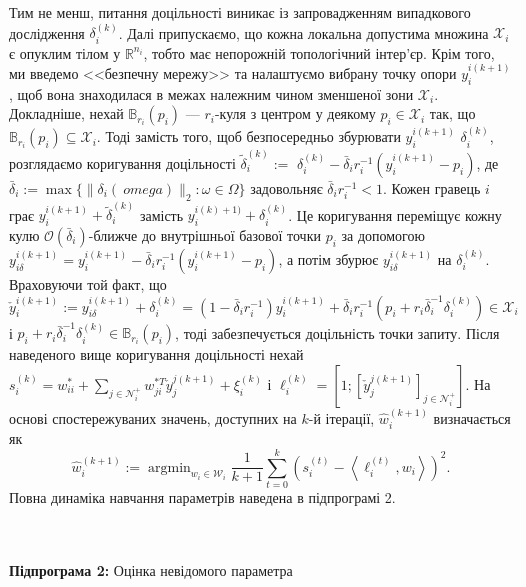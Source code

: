 \documentclass[a4paper]{article}
\begin{document}
Тим не менш, питання доцільності виникає із запровадженням випадкового дослідження $\delta_{i}^{(k)}$. Далі припускаємо, що кожна локальна допустима множина $\mathcal{X}_{i}$ є опуклим тілом у $\mathbb{R}^{n_{i}}$, тобто має непорожній топологічний інтер'єр. Крім того, ми введемо <<безпечну мережу>> та налаштуємо вибрану точку опори $y_{i}^{i(k+1)}$, щоб вона знаходилася в межах належним чином зменшеної зони $\mathcal{X}_{i} $. Докладніше, нехай $\mathbb{B}_{r_{i}}(p_{i})$ — $r_{i}$-куля з центром у деякому $p_{i} \in \mathcal {X}_{i}$ так, що $\mathbb{B}_{r_{i}}(p_{i}) \subseteq \mathcal{X}_{i}$. Тоді замість того, щоб безпосередньо збурювати $y_{i}^{i(k+1)}$ $\delta_{i}^{(k)}$, розглядаємо коригування доцільності $\tilde{\delta}_{ i}^{(k)}:=$ $\delta_{i}^{(k)}-\bar{\delta}_{i} r_{i}^{-1}(y_{i} ^{i(k+1)}-p_{i})$, де $\bar{\delta}_{i}:=\max \{\|\delta_{i}(\ omega)\|_{2}: \omega \in \Omega\}$ задовольняє $\bar{\delta}_{i} r_{i}^{-1}<1$. Кожен гравець $i$ грає $y_{i}^{i(k+1)}+\tilde{\delta}_{i}^{(k)}$ замість $y_{i}^{i(k) +1)}+\delta_{i}^{(k)}$. Це коригування переміщує кожну кулю  $\mathcal{O}(\bar{\delta}_{i})$-ближче до внутрішньої базової точки $p_{i}$ за допомогою $y_{i \delta}^ {i(k+1)}=y_{i}^{i(k+1)}-\bar{\delta}_{i} r_{i}^{-1}(y_{i}^ {i(k+1)}-p_{i})$, а потім збурює $y_{i \delta}^{i(k+1)}$ на $\delta_{i}^{(k) }$. Враховуючи той факт, що $\check{y}_{i}^{i(k+1)}:=y_{i \delta}^{i(k+1)}+\delta_{i}^{(k )}=(1-\bar{\delta}_{i} r_{i}^{-1}) y_{i}^{i(k+1)}+\bar{\delta} _{i} r_{i}^{-1}(p_{i}+r_{i} \bar{\delta}_{i}^{-1} \delta_{i}^{(k) }) \in \mathcal{X}_{i}$ і $p_{i}+r_{i} \bar{\delta}_{i}^{-1} \delta_{i}^{( k)} \in \mathbb{B}_{r_{i}}(p_{i})$, тоді забезпечується доцільність точки запиту. Після наведеного вище коригування доцільності нехай $s_{i}^{(k)}=w_{i i}^{*}+\sum_{j \in \mathcal{N}_{i}^{+}} w_{ j i}^{* T} \check{y}_{j}^{j(k+1)}+\xi_{i}^{(k)}$ і $\ell_{i}^{(k) }=[1 ;[\check{y}_{j}^{j(k+1)}]_{j \in \mathcal{N}_{i}^{+}} ]$. На основі спостережуваних значень, доступних на $k$-й ітерації, $\hat{w}_{i}^{(k+1)}$ визначається як
\begin{equation}\label{prog2}
    \hat{w}_{i}^{(k+1)}:=\operatorname{argmin}_{w_{i} \in \mathcal{W}_{i}} \frac{1}{k+1} \sum_{t=0}^{k}\left(s_{i}^{(t)}-\left\langle\ell_{i}^{(t)}, w_{i}\right\rangle\right)^{2} .
\end{equation}
Повна динаміка навчання параметрів наведена в підпрограмі 2.\\

\hline\\\

\textbf{Підпрограма 2:} Оцінка невідомого параметра\\
\end{document}
